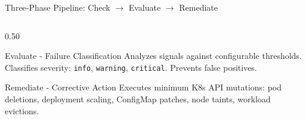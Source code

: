 \documentclass[aspectratio=169, 11pt]{beamer}
\begin{document}
\begin{frame}{Three-Phase Pipeline: Check $\to$ Evaluate $\to$ Remediate}
\begin{columns}[T]
\begin{column}{0.50\textwidth}
\begin{block}{Evaluate - Failure Classification}
\footnotesize
Analyzes signals against configurable thresholds. Classifies severity: \texttt{info}, \texttt{warning}, \texttt{critical}. Prevents false positives.
\end{block}

\begin{block}{Remediate - Corrective Action}
\footnotesize
Executes minimum K8s API mutations: pod deletions, deployment scaling, ConfigMap patches, node taints, workload evictions.
\end{block}
\end{column}
\end{columns}

\end{frame}

\end{document}
